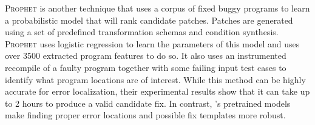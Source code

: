 \textsc{Prophet} \citep{Long_2016} is another technique that uses a corpus of
fixed buggy programs to learn a probabilistic model that will rank candidate
patches. Patches are generated using a set of predefined transformation schemas
and condition synthesis. \textsc{Prophet} uses logistic regression to learn the
parameters of this model and uses over 3500 extracted program features to do so.
It also uses an instrumented recompile of a faulty program together with some
failing input test cases to identify what program locations are of interest.
While this method can be highly accurate for error localization, their
experimental results show that it can take up to 2 hours to produce a valid
candidate fix. In contrast, \toolname's pretrained models make finding proper
error locations and possible fix templates more robust.

